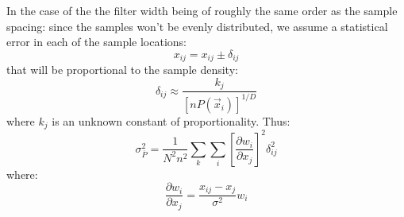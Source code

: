 \documentclass[11pt]{article}
\begin{document}
In the case of the the filter width being of roughly the same order as the sample
spacing: since the samples won't be evenly distributed, we assume a statistical
 error in each of the sample locations:
\begin{equation}
  x_{ij} = x_{ij} \pm \delta_{ij}
\end{equation}
that will be proportional to the sample density:
\begin{equation}
  \delta_{ij} \approx \frac{k_j}{\left [nP(\vec x_i) \right ]^{1/D}}
\end{equation}
where $k_j$ is an unknown constant of proportionality.
Thus:
\begin{equation}
\sigma_{\overline P}^2 = \frac{1}{N^2n^2} \sum_k \sum_i 
	\left [ \frac{\partial w_i}{\partial x_j} \right ]^2 \delta_{ij}^2
\end{equation}
where:
\begin{equation}
\frac{\partial w_i}{\partial x_j} = \frac{x_{ij} - x_j}{\sigma^2} w_i
\end{equation}
\end{document}

